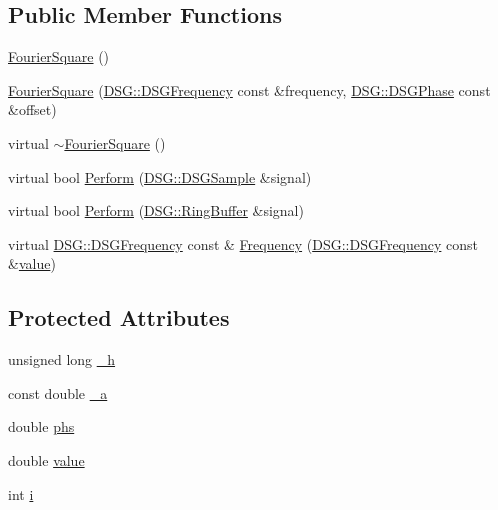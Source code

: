 \subsection*{Public Member Functions}
\begin{DoxyCompactItemize}
\item 
\hyperlink{class_d_s_g_1_1_fourier_1_1_fourier_square_a48fa53b8b5ea77013e1bbb2b2467d15e}{Fourier\+Square} ()
\item 
\hyperlink{class_d_s_g_1_1_fourier_1_1_fourier_square_a277316295ca15354a6e507a71cb5f0db}{Fourier\+Square} (\hyperlink{namespace_d_s_g_a4315a061386fa1014fda09b15d3a6973}{D\+S\+G\+::\+D\+S\+G\+Frequency} const \&frequency, \hyperlink{namespace_d_s_g_a44431ce1eb0a7300efdd207bc879e52c}{D\+S\+G\+::\+D\+S\+G\+Phase} const \&offset)
\item 
virtual \hyperlink{class_d_s_g_1_1_fourier_1_1_fourier_square_af78565a799ebfd4be03cc0294dff1f85}{$\sim$\+Fourier\+Square} ()
\item 
virtual bool \hyperlink{class_d_s_g_1_1_fourier_1_1_fourier_square_a05bd0cd3e76ca22e1cede5afb47fbbc4}{Perform} (\hyperlink{namespace_d_s_g_ac39a94cd27ebcd9c1e7502d0c624894a}{D\+S\+G\+::\+D\+S\+G\+Sample} \&signal)
\item 
virtual bool \hyperlink{class_d_s_g_1_1_fourier_1_1_fourier_square_a46028a3615f26876f9c613f983141362}{Perform} (\hyperlink{class_d_s_g_1_1_ring_buffer}{D\+S\+G\+::\+Ring\+Buffer} \&signal)
\item 
virtual \hyperlink{namespace_d_s_g_a4315a061386fa1014fda09b15d3a6973}{D\+S\+G\+::\+D\+S\+G\+Frequency} const \& \hyperlink{class_d_s_g_1_1_fourier_1_1_fourier_square_a120cbb563a518c9412190eaa36cb269f}{Frequency} (\hyperlink{namespace_d_s_g_a4315a061386fa1014fda09b15d3a6973}{D\+S\+G\+::\+D\+S\+G\+Frequency} const \&\hyperlink{class_d_s_g_1_1_fourier_1_1_fourier_square_a5817c7b9b793af6a76278065a67acd9c}{value})
\end{DoxyCompactItemize}
\subsection*{Protected Attributes}
\begin{DoxyCompactItemize}
\item 
unsigned long \hyperlink{class_d_s_g_1_1_fourier_1_1_fourier_square_ac482ccc644bac01f3491503a755b453c}{\+\_\+h}
\item 
const double \hyperlink{class_d_s_g_1_1_fourier_1_1_fourier_square_a974287b077bd7bff2b028dd1af75e3d0}{\+\_\+a}
\item 
double \hyperlink{class_d_s_g_1_1_fourier_1_1_fourier_square_a6e20ab344501c18d79d594ec83f34164}{phs}
\item 
double \hyperlink{class_d_s_g_1_1_fourier_1_1_fourier_square_a5817c7b9b793af6a76278065a67acd9c}{value}
\item 
int \hyperlink{class_d_s_g_1_1_fourier_1_1_fourier_square_ad52c23216a09d1933e5b3289f2d54db2}{i}
\end{DoxyCompactItemize}
